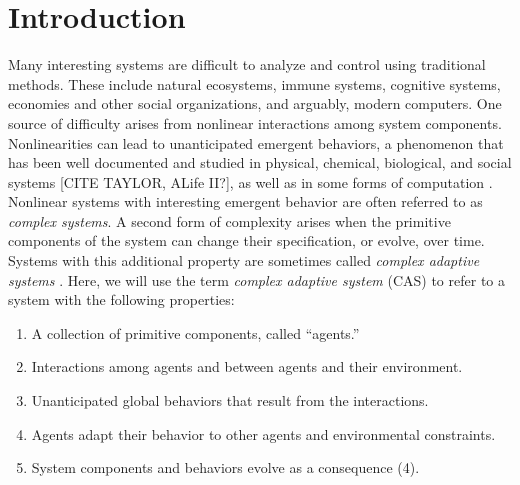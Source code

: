 \section{Introduction}
\label{intro}

Many interesting systems are difficult to analyze and control using
traditional methods.  These include natural ecosystems, immune
systems, cognitive systems, economies and other social organizations,
and arguably, modern computers.  One source of difficulty arises from
nonlinear interactions among system components.  Nonlinearities can
lead to unanticipated emergent behaviors, a phenomenon that has been
well documented and studied in physical, chemical, biological, and
social systems [CITE TAYLOR, ALife II?], as well as in some forms of
computation \cite{Forrest91b}.  Nonlinear systems with interesting
emergent behavior are often referred to as {\em complex systems}.  A
second form of complexity arises when the primitive components of the
system can change their specification, or evolve, over time.  Systems
with this additional property are sometimes called {\em complex
adaptive systems\/}
\cite{Holland95a}.  Here, we will use the term {\em complex adaptive
system\/} (CAS) to refer to a system with the following properties:
\begin{enumerate}
\item A collection of primitive components, called ``agents.''
\item Interactions among agents and between agents and their
  environment.
\item Unanticipated global behaviors that result from the
  interactions.
\item Agents adapt their behavior to other agents and environmental
  constraints.
\item System components and behaviors evolve as a consequence (4).
\end{enumerate}


